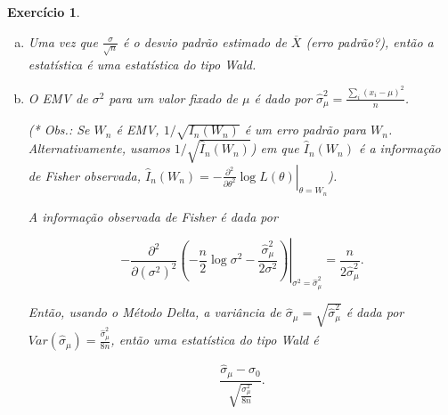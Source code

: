 \documentclass[letter,11pt]{article}
\newtheorem{exer}{Exercício}
\begin{document}

\begin{exer} \rm 

\begin{enumerate}[a)]

\item %

Uma vez que $\frac{\sigma}{\sqrt n}$ é o desvio padrão estimado de $\overline X$ (erro padrão?), então a estatística é uma estatística do tipo Wald.

\item %

O EMV de $\sigma^2$ para um valor fixado de $\mu$ é dado por $\hat \sigma^2_\mu = \frac{\sum_i (x_i - \mu)^2}{n}$. 

(* Obs.: Se $W_n$ é EMV, $1 / \sqrt{I_n(W_n)}$ é um erro padrão para $W_n$. Alternativamente, usamos $1 / \sqrt{\hat{I}_n(W_n)}$) em que $\hat{I}_n(W_n)$ é a informação de Fisher observada, $\left. \hat{I}_n(W_n) = - \frac{\partial^2}{\partial \theta^2} \log L(\theta) \right|_{\theta = W_n}$).

A informação observada de Fisher é dada por 

$$\left. - \frac{\partial^2}{\partial (\sigma^2)^2} \left(- \frac{n}{2} \log \sigma^2 - \frac{\hat \sigma^2_\mu}{2 \sigma^2} \right) \right|_{\sigma^2 = \hat \sigma^2_\mu} = \frac{n}{2 \hat \sigma^2_\mu}.$$

Então, usando o Método Delta, a variância de $\hat \sigma_\mu = \sqrt{\hat \sigma^2_\mu}$ é dada por $Var(\hat \sigma_\mu) = \frac{\hat \sigma^2_\mu}{8n}$, então uma estatística do tipo Wald é

$$\frac{\hat \sigma_\mu - \sigma_0}{\sqrt{\frac{\sigma^2_\mu}{8n}}}.$$

\end{enumerate}
\end{exer}
\end{document}
